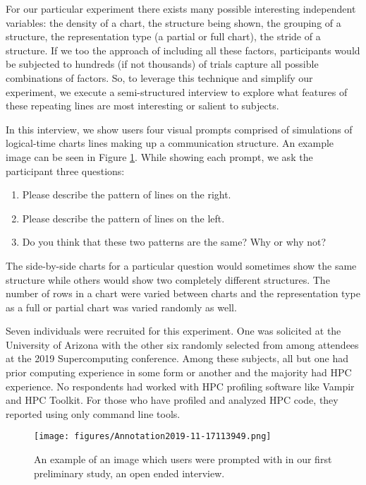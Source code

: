 For our particular experiment there exists many possible interesting independent variables: the density of a chart, the structure being shown, the grouping of a structure, the representation type (a partial or full chart), the stride of a structure. If we too the approach of including all these factors, participants would be subjected to hundreds (if not thousands) of trials capture all possible combinations of factors. So, to leverage this technique and simplify our experiment, we execute a semi-structured interview to explore what features of these repeating lines are most interesting or salient to subjects.

In this interview, we show users four visual prompts comprised of simulations of logical-time charts  lines making up a communication structure. An example image can be seen in Figure \ref{fig:interview_prompt}. While showing each prompt, we ask the participant three questions:

\begin{enumerate}
    \item Please describe the pattern of lines on the right.
    \item Please describe the pattern of lines on the left.
    \item Do you think that these two patterns are the same? Why or why not?
\end{enumerate}

The side-by-side charts for a particular question would sometimes show the same structure while others would show two completely different structures. The number of rows in a chart were varied between charts and the representation type as a full or partial chart was varied randomly as well.  

Seven individuals were recruited for this experiment. One was solicited at the University of Arizona with the other six randomly selected from among attendees at the 2019 Supercomputing conference. Among these subjects, all but one had prior computing experience in some form or another and the majority had HPC experience. No respondents had worked with HPC profiling software like Vampir and HPC Toolkit. For those who have profiled and analyzed HPC code, they reported using only command line tools.

\begin{figure}[h]
    \centering
    \texttt{[image: figures/Annotation2019-11-17113949.png]}
    \caption{An example of an image which users were prompted with in our first preliminary study, an open ended interview.}
    \label{fig:interview_prompt}
\end{figure}

